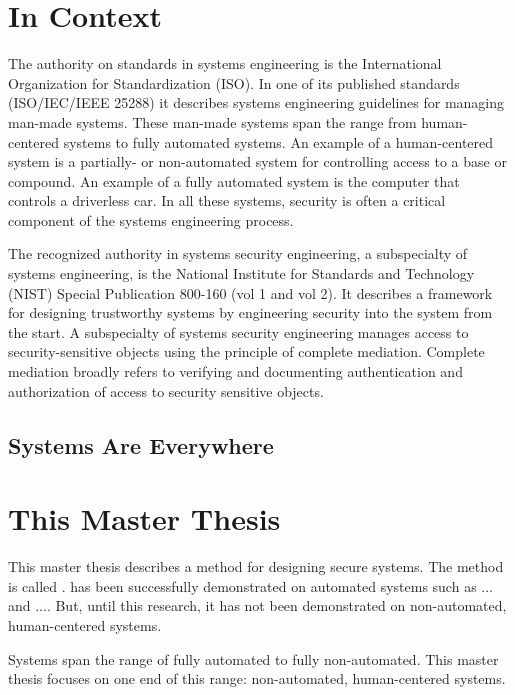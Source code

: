 \documentclass[../../main/main.tex]{subfiles}
\begin{document}
\section{In Context}\label{sec:intro:motivation}
The authority on standards in systems engineering is the International Organization for Standardization (ISO).  In one of its published standards (ISO/IEC/IEEE 25288) it describes systems engineering guidelines for managing man-made systems.  These man-made systems span the range from human-centered systems to fully automated systems.  An example of a human-centered system is a partially- or non-automated system for controlling access to a base or compound.  An example of a fully automated system is the computer that controls a driverless car.  In all these systems, security is often a critical component of the systems engineering process.


The recognized authority in systems security engineering, a subspecialty of systems engineering, is the National Institute for Standards and Technology (NIST) Special Publication 800-160 (vol 1 and vol 2).  It describes a framework for designing trustworthy systems by engineering security into the system from the start.  A subspecialty of systems security engineering manages access to security-sensitive objects using the principle of complete mediation.  Complete mediation broadly refers to verifying and documenting authentication and authorization of access to security sensitive objects. 


\subsection{Systems Are Everywhere}

\section{This Master Thesis}\label{sec:thismasterthesis}
\glsresetall
This master thesis describes a method for designing secure systems.  The method is called .    has been successfully demonstrated on automated systems such as ... and ....  But, until this research, it has not been demonstrated on non-automated, human-centered systems.  

Systems span the range of fully automated to fully non-automated.  This master thesis focuses on one end of this range: non-automated, human-centered systems.
\end{document}
